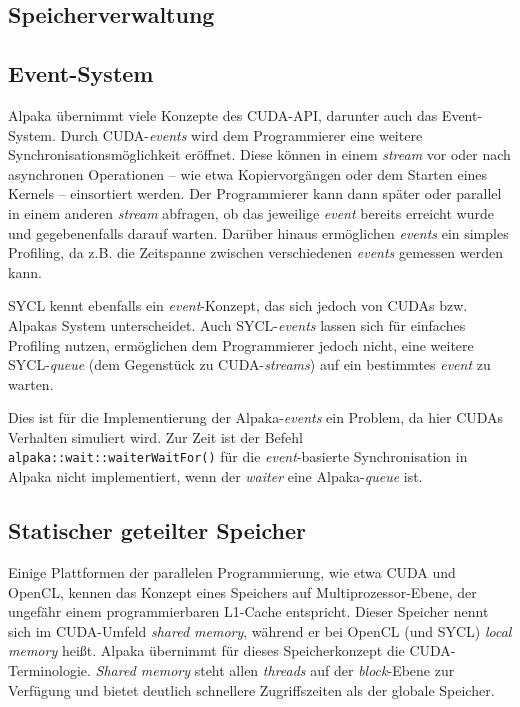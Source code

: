 \subsection{Speicherverwaltung}\label{implementierung:probleme:speicher}

\subsection{Event-System}\label{implementierung:probleme:events}

Alpaka übernimmt viele Konzepte des CUDA-API, darunter auch das Event-System.
Durch CUDA-\textit{events} wird dem Programmierer eine weitere
Synchronisationsmöglichkeit eröffnet. Diese können in einem \textit{stream} vor
oder nach asynchronen Operationen -- wie etwa Kopiervorgängen oder dem Starten
eines Kernels -- einsortiert werden. Der Programmierer kann dann später oder
parallel in einem anderen \textit{stream} abfragen, ob das jeweilige
\textit{event} bereits erreicht wurde und gegebenenfalls darauf warten. Darüber
hinaus ermöglichen \textit{events} ein simples Profiling, da z.B. die Zeitspanne
zwischen verschiedenen \textit{events} gemessen werden kann.

SYCL kennt ebenfalls ein \textit{event}-Konzept, das sich jedoch von CUDAs bzw.
Alpakas System unterscheidet. Auch SYCL-\textit{events} lassen sich für
einfaches Profiling nutzen, ermöglichen dem Programmierer jedoch nicht, eine
weitere SYCL-\textit{queue} (dem Gegenstück zu CUDA-\textit{streams}) auf ein
bestimmtes \textit{event} zu warten.

Dies ist für die Implementierung der Alpaka-\textit{events} ein Problem, da hier
CUDAs Verhalten simuliert wird. Zur Zeit ist der Befehl
\texttt{alpaka::wait::waiterWaitFor()} für die \textit{event}-basierte
Synchronisation in Alpaka nicht implementiert, wenn der \textit{waiter} eine
Alpaka-\textit{queue} ist.

\subsection{Statischer geteilter Speicher}
\label{implementierung:probleme:shared}

Einige Plattformen der parallelen Programmierung, wie etwa CUDA und OpenCL,
kennen das Konzept eines Speichers auf Multiprozessor-Ebene, der ungefähr
einem programmierbaren L1-Cache entspricht. Dieser Speicher nennt sich im
CUDA-Umfeld \textit{shared memory}, während er bei OpenCL (und SYCL)
\textit{local memory} heißt. Alpaka übernimmt für dieses Speicherkonzept die
CUDA-Terminologie. \textit{Shared memory} steht allen \textit{threads} auf
der \textit{block}-Ebene zur Verfügung und bietet deutlich schnellere
Zugriffszeiten als der globale Speicher.

